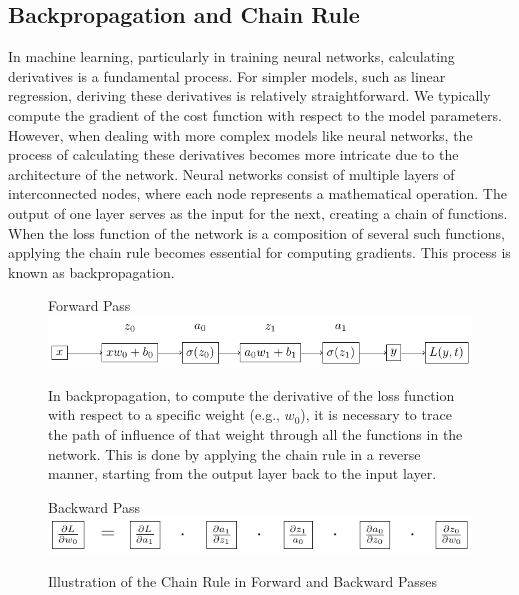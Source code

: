\documentclass[twoside,11pt]{report}
\begin{document}
\subsection{Backpropagation and Chain Rule}
\label{sec:backpropagation}

    In machine learning, particularly in training neural networks, calculating derivatives is a fundamental process. 
    For simpler models, such as linear regression, deriving these derivatives is relatively straightforward. 
    We typically compute the gradient of the cost function with respect to the model parameters. However, 
    when dealing with more complex models like neural networks, the process of calculating these derivatives 
    becomes more intricate due to the architecture of the network.
    Neural networks consist of multiple layers of interconnected nodes, where each node represents a mathematical 
    operation. The output of one layer serves as the input for the next, creating a chain of functions. 
    When the loss function of the network is a composition of several such functions, applying the chain rule 
    becomes essential for computing gradients. This process is known as backpropagation.

    \begin{figure}[!h]
        \begin{center}
            Forward Pass\\
            \includegraphics[width=\textwidth]{tikzfigures/forward.pdf}\\
        \end{center}
        In backpropagation, to compute the derivative of the loss function with respect to a specific 
        weight (e.g., $w_0$), it is necessary to trace the path of influence of that weight through all 
        the functions in the network. This is done by applying the chain rule in a reverse manner, 
        starting from the output layer back to the input layer.
        \begin{center}
            Backward Pass\\
            \hspace{1cm}
            \includegraphics[width=\textwidth]{tikzfigures/backwards.pdf}
        \end{center}
        \caption{Illustration of the Chain Rule in Forward and Backward Passes}\label{fig:chainrule}
    \end{figure}
\end{document}
